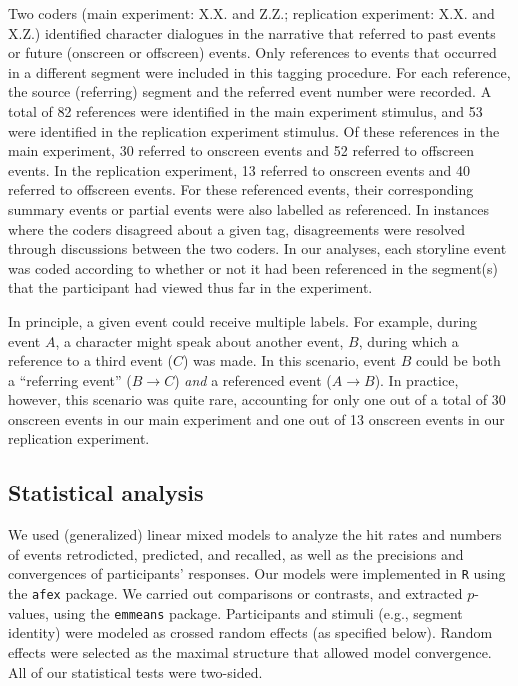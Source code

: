 \documentclass[10pt]{article}
\begin{document}
Two coders (main experiment: X.X. and Z.Z.; replication experiment: X.X. and X.Z.) identified character dialogues in the narrative that referred to past events or future (onscreen or offscreen) events. Only references to events that occurred in a different segment were included in this tagging procedure. For each reference, the source (referring) segment and the referred event number were recorded. A total of 82 references were identified in the main experiment stimulus, and 53 were identified in the replication experiment stimulus. Of these references in the main experiment, 30 referred to onscreen events and 52 referred to offscreen events. In the replication experiment, 13 referred to onscreen events and 40 referred to offscreen events. For these referenced events, their corresponding summary events or partial events were also labelled as referenced. In instances where the coders disagreed about a given tag, disagreements were resolved through discussions between the two coders. In our analyses, each storyline event was coded according to whether or not it had been referenced in the segment(s) that the participant had viewed thus far in the experiment.

In principle, a given event could receive multiple labels. For example, during event $A$, a character might speak about another event, $B$, during which a reference to a third event ($C$) was made. In this scenario, event $B$ could be both a ``referring event'' ($B \rightarrow C$) \textit{and} a referenced event ($A \rightarrow B$). In practice, however, this scenario was quite rare, accounting for only one out of a total of 30 onscreen events in our main experiment and one out of 13 onscreen events in our replication experiment.

\subsection*{Statistical analysis}

We used (generalized) linear mixed models to analyze the hit rates and numbers of events retrodicted, predicted, and recalled, as well as the precisions and convergences of participants' responses. Our models were implemented in \texttt{R} using the \texttt{afex} package. We carried out comparisons or contrasts, and extracted $p$-values, using the \texttt{emmeans} package. Participants and stimuli (e.g., segment identity) were modeled as crossed random effects (as specified below). Random effects were selected as the maximal structure that allowed model convergence. All of our statistical tests were two-sided.
\end{document}
